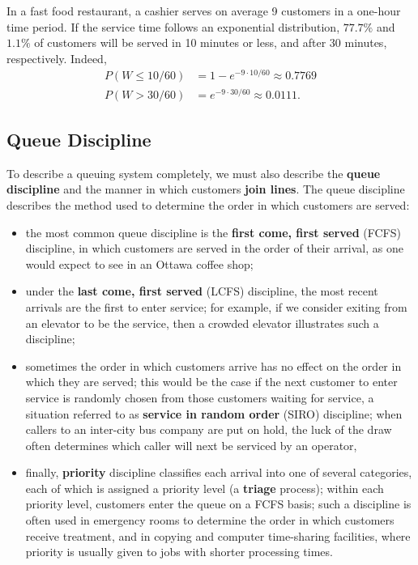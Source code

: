\begin{Example}
 In a fast food restaurant, a cashier serves on average 9 customers in a one-hour time period. If the service time follows an exponential distribution, $77.7\%$ and $1.1\%$ of customers will be served in 10 minutes or less, and after 30 minutes, respectively. Indeed, \begin{align*}P(W\leq 10/60)&=1-e^{-9 \cdot 10/60} \approx 0.7769\\ P(W>30/60)&=e^{-9\cdot 30/60}\approx 0.0111.\end{align*}
\end{Example}

\subsection{Queue Discipline}
To describe a queuing system completely, we must also describe the \textbf{queue discipline} and the manner in which customers \textbf{join lines}. The queue discipline describes the method used to determine the order in which customers are served: 
\begin{itemize}
\item the most common queue discipline is the \textbf{first come, first served} (FCFS) discipline, in which customers are served in the order of their arrival, as one would expect to see in an Ottawa coffee shop;
\item under the \textbf{last come, first served} (LCFS) discipline, the most recent arrivals are the first to enter service; for example, if we consider exiting from an elevator to be the service, then a crowded elevator illustrates such a discipline;
\item sometimes the order in which customers arrive has no effect on the order in which they are served; this would be the case if the next customer to enter service is randomly chosen from those customers waiting for service, a situation referred to as \textbf{service in random order} (SIRO) discipline; when callers to an inter-city bus company are put on hold, the luck of the draw often determines which caller will next be serviced by an operator, 
\item finally, \textbf{priority} discipline classifies each arrival into one of several categories, each of which is assigned a priority level (a \textbf{triage} process); within each priority level, customers enter the queue on a FCFS basis; such a discipline is often used in emergency rooms to determine the order in which customers receive treatment, and in copying and computer time-sharing facilities, where priority is usually given to jobs with shorter processing times.
\end{itemize}

